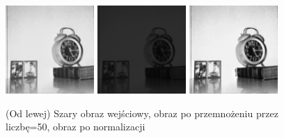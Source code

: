 \documentclass[final,a4paper,openany,12pt]{mwbk}
\begin{document}
\begin{figure}[H]
	\begin{center}
		\includegraphics[width=0.3\textwidth]{1/1Gray_Const_Multipl_Original}
		\includegraphics[width=0.3\textwidth]{1/1Gray_Const_Multipl_Result}
		\includegraphics[width=0.3\textwidth]{1/1Gray_Const_Multipl_Result_Norm}
	\end{center}
	\caption{(Od lewej) Szary obraz wejściowy, obraz po przemnożeniu przez liczbę=50, obraz po normalizacji }
\end{figure}
\end{document}

